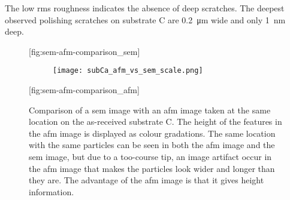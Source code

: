 The low \ac{rms} roughness indicates the absence of deep scratches. The deepest observed polishing scratches on substrate C are \SI{0,2}{\micro\metre} wide and only \SI{1}{\nano\metre} deep. 

\begin{figure}[htbp]
    \centering
    [fig:sem-afm-comparison_sem]
    \hfill\hfill
    \begin{subfigure}[c]{0.04\linewidth}
        \label{fig:subCa_afm_vs_sem_scale}\captionsetup{list=no}
        \texttt{[image: subCa\_afm\_vs\_sem\_scale.png]}
    \end{subfigure}
    \hfill
    [fig:sem-afm-comparison_afm]
    \caption[Comparison of an \ac{afm} image with a \ac{sem} image taken at the same location on substrate C.]{Comparison of  a \ac{sem} image with  an \ac{afm} image taken at the same location on the as-received substrate C. The height of the features in the \ac{afm} image is displayed as colour gradations. The same location with the same particles can be seen in both the \ac{afm} image and the \ac{sem} image, but due to a too-course tip, an image artifact occur in the \ac{afm} image that makes the particles look wider and longer than they are. The advantage of the \ac{afm} image is that it gives height information.}
    \label{fig:sem-afm-comparison}
\end{figure}


